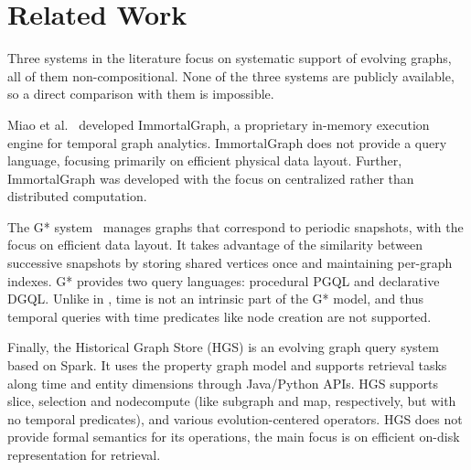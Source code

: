 \section{Related Work}
\label{sec:related}

Three systems in the literature focus on systematic support of
evolving graphs, all of them non-compositional.  None of the three
systems are publicly available, so a direct comparison with them is
impossible.

Miao et al.~\cite{Miao2015} developed ImmortalGraph, a proprietary
in-memory execution engine for temporal graph analytics.
ImmortalGraph does not provide a query language, focusing primarily on
efficient physical data layout. Further, ImmortalGraph was developed with the focus on
centralized rather than distributed computation.

The G* system~\cite{Labouseur2015} manages graphs that correspond to
periodic snapshots, with the focus on efficient data layout.  It takes
advantage of the similarity between successive snapshots by storing
shared vertices once and maintaining per-graph indexes. G* provides
two query languages: procedural PGQL and declarative DGQL. Unlike in
\tga, time is not an intrinsic part of the G* model, and thus temporal
queries with time predicates like node creation are not supported.

Finally, the Historical Graph Store (HGS) is an evolving graph query
system based on Spark.  It uses the property graph model and supports
retrieval tasks along time and entity dimensions through Java/Python
APIs.  HGS supports slice, selection and nodecompute (like \tga
subgraph and map, respectively, but with no temporal predicates), and
various evolution-centered operators.  HGS does not provide formal
semantics for its operations, the main focus is on efficient on-disk
representation for retrieval.


